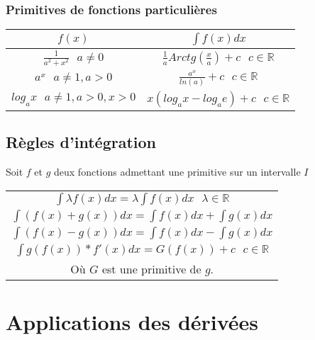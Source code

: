 \documentclass[12pt, a4paper]{book}
\begin{document}
\subsubsection{Primitives de fonctions particulières}
\begin{center}
    \begin{tabular}{|c|c|}
        \hline
       $f(x)$ & $\int f(x)dx$\\
        \hline
        $\frac{1}{a^2+x^2} \ \ \ a \not = 0$& $\frac{1}{a}Arctg(\frac{x}{a})+c \ \ \ c \in \mathbb{R}$\\
        $a^x \ \ \ a \not = 1, a>0$& $\frac{a^x}{ln(a)}+c \ \ \ c \in \mathbb{R}$\\
        $log_ax \ \ \ a \not = 1, a>0, x>0$& $x(log_ax-log_ae)+c \ \ \ c \in \mathbb{R}$\\
    
        \hline
    \end{tabular}
\end{center}
\newpage
\subsection{Règles d'intégration}
Soit $f$ et $g$ deux fonctions admettant une primitive sur un intervalle $I$
\begin{center}
    \begin{tabular}{|c|}
        \hline
        $\int \lambda f(x)dx = \lambda \int f(x)dx \ \ \ \lambda \in \mathbb{R}$\\
        $\int (f(x)+g(x))dx = \int f(x)dx + \int g(x)dx $\\
        $\int (f(x)-g(x))dx = \int f(x)dx - \int g(x)dx $\\
        $\int g(f(x))*f'(x)dx = G(f(x)) + c \ \ \ c \in \mathbb{R}$\\
        Où $G$ est une primitive de $g$.\\
        \hline
    \end{tabular}
\end{center}
\newpage
\section{Applications des dérivées}
\end{document}
